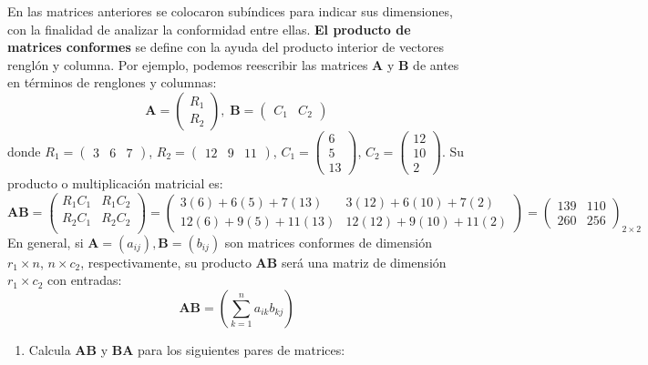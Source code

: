\documentclass[8pt,a4paper]{article}
\begin{document}
\begin{enumerate}
	En las matrices anteriores se colocaron subíndices para indicar sus dimensiones, con la finalidad de analizar la conformidad entre ellas. \textbf{El producto de matrices conformes} se define con la ayuda del producto interior de vectores renglón y columna. Por ejemplo, podemos reescribir las matrices $\mathbf{A}$ y $\mathbf{B}$ de antes en términos de renglones y columnas:
%
		\[ \mathbf{A}=\begin{pmatrix} R_1 \\ R_2 \end{pmatrix}, \;
		\mathbf{B}=\begin{pmatrix} C_1 & C_2 \end{pmatrix}\]
%
donde $R_1=\begin{pmatrix}3 & 6 & 7\end{pmatrix}$, $R_2=\begin{pmatrix}12 & 9 & 11\end{pmatrix}$, $C_1=\begin{pmatrix}6 \\ 5 \\ 13 \end{pmatrix}$, $C_2=\begin{pmatrix} 12 \\ 10 \\ 2 \end{pmatrix}$. Su producto o multiplicación matricial es:
%
	\[\mathbf{A}\mathbf{B}=\begin{pmatrix}
							R_1C_1 & R_1C_2  \\
							R_2C_1 & R_2C_2 \\
							\end{pmatrix}
						=\begin{pmatrix}
							3(6)+6(5)+7(13) & 3(12)+6(10)+7(2) \\
							12(6)+9(5)+11(13) & 12(12)+9(10)+11(2)
						\end{pmatrix}
						=\begin{pmatrix}
							139 & 110 \\
							260 & 256
						\end{pmatrix}_{2\times 2}
	\]
%
	En general, si $\mathbf{A}=\left(a_{ij}\right), \mathbf{B}=\left(b_{ij}\right)$ son matrices conformes de dimensión $r_1\times n$, $n \times c_2$, respectivamente, su producto $\mathbf{AB}$ será una matriz de dimensión $r_1\times c_2$ con entradas:
%
	\[\mathbf{AB}=\left(\sum_{k=1}^n a_{ik}b_{kj}\right)\]
%
		\begin{enumerate}
			\item Calcula $\mathbf{AB}$ y $\mathbf{BA}$ para los siguientes pares de matrices:

\end{enumerate}
\end{enumerate}
\end{document}
